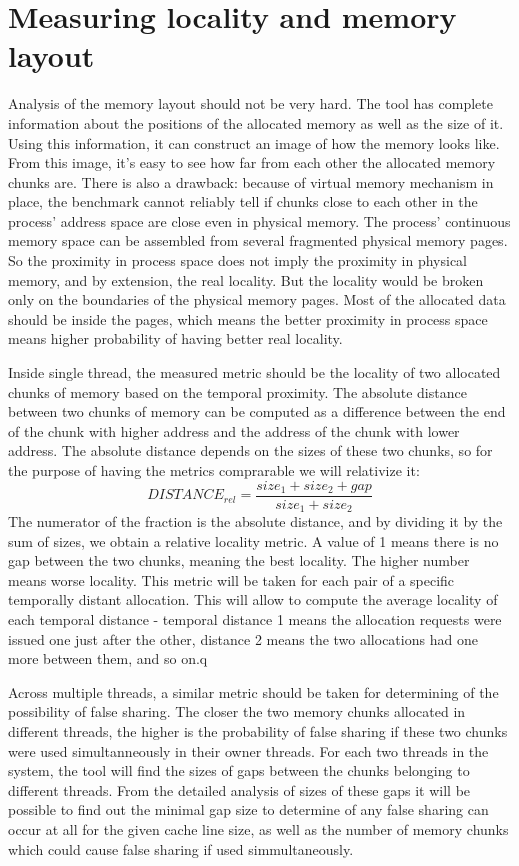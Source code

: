 \section{Measuring locality and memory layout}
\label{methodology:locality}

Analysis of the memory layout should not be very hard. The tool has complete
information about the positions of the allocated memory as well as the size of
it. Using this information, it can construct an image of how the memory looks
like. From this image, it's easy to see how far from each other the allocated
memory chunks are. There is also a drawback: because of virtual memory mechanism
in place, the benchmark cannot reliably tell if chunks close to each other in the
process' address space are close even in physical memory. The process' continuous
memory space can be assembled from several fragmented physical memory pages. So
the proximity in process space does not imply the proximity in physical memory,
and by extension, the real locality. But the locality would be broken only on the
boundaries of the physical memory pages. Most of the allocated data should be
inside the pages, which means the better proximity in process space means higher
probability of having better real locality.

Inside single thread, the measured metric should be the locality of two allocated
chunks of memory based on the temporal proximity. The absolute distance between
two chunks of memory can be computed as a difference between the end of the chunk
with higher address and the address of the chunk with lower address. The absolute
distance depends on the sizes of these two chunks, so for the purpose of having
the metrics comprarable we will relativize it:
\begin{displaymath}
DISTANCE_{rel} = \frac{size_1 + size_2 + gap}{size_1 + size_2}
\end{displaymath}
The numerator of the fraction is the absolute distance, and by dividing it by the
sum of sizes, we obtain a relative locality metric. A value of 1 means there is
no gap between the two chunks, meaning the best locality. The higher number means
worse locality. This metric will be taken for each pair of a specific temporally
distant allocation. This will allow to compute the average locality of each
temporal distance - temporal distance 1 means the allocation requests were issued
one just after the other, distance 2 means the two allocations had one more
between them, and so on.q

Across multiple threads, a similar metric should be taken for determining of the
possibility of false sharing. The closer the two memory chunks allocated in
different threads, the higher is the probability of false sharing if these two
chunks were used simultanneously in their owner threads. For each two threads in
the system, the tool will find the sizes of gaps between the chunks belonging to
different threads. From the detailed analysis of sizes of these gaps it will be
possible to find out the minimal gap size to determine of any false sharing can
occur at all for the given cache line size, as well as the number of memory
chunks which could cause false sharing if used simmultaneously.

